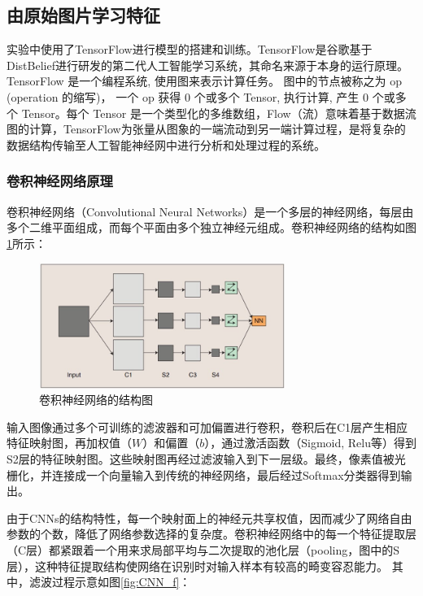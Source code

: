 \subsection{由原始图片学习特征}
实验中使用了{\ttfamily TensorFlow}进行模型的搭建和训练。{\ttfamily TensorFlow}是谷歌基于{\ttfamily DistBelief}进行研发的第二代人工智能学习系统，其命名来源于本身的运行原理。{\ttfamily TensorFlow} 是一个编程系统, 使用图来表示计算任务。 图中的节点被称之为 op (operation 的缩写)， 一个 op 获得 0 个或多个 {\ttfamily Tensor}, 执行计算, 产生 0 个或多个 {\ttfamily Tensor}。每个 {\ttfamily Tensor} 是一个类型化的多维数组，{\ttfamily Flow}（流）意味着基于数据流图的计算，{\ttfamily TensorFlow}为张量从图象的一端流动到另一端计算过程，是将复杂的数据结构传输至人工智能神经网中进行分析和处理过程的系统。
\subsubsection{卷积神经网络原理}
	卷积神经网络（Convolutional Neural Networks）是一个多层的神经网络，每层由多个二维平面组成，而每个平面由多个独立神经元组成。卷积神经网络的结构如图\ref{fig:CNN}所示：

	\begin{figure}[htbp]
	\centering
	\includegraphics[width=8cm]{resource/CNN_structure.jpg}
	\caption{卷积神经网络的结构图}
	\label{fig:CNN}
	\end{figure}

	输入图像通过多个可训练的滤波器和可加偏置进行卷积，卷积后在C1层产生相应特征映射图，再加权值（$W$）和偏置（$b$），通过激活函数（{\ttfamily Sigmoid, Relu}等）得到S2层的特征映射图。这些映射图再经过滤波输入到下一层级。最终，像素值被光栅化，并连接成一个向量输入到传统的神经网络，最后经过{\ttfamily Softmax}分类器得到输出。

	由于CNNs的结构特性，每一个映射面上的神经元共享权值，因而减少了网络自由参数的个数，降低了网络参数选择的复杂度。卷积神经网络中的每一个特征提取层（C层）都紧跟着一个用来求局部平均与二次提取的池化层（pooling，图中的S层），这种特征提取结构使网络在识别时对输入样本有较高的畸变容忍能力。
	其中，滤波过程示意如图\ref{fig:CNN_f}：

